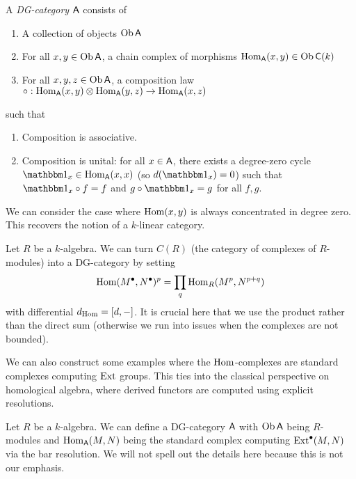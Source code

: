 \documentclass{amsart}
\begin{document}
\begin{dfn}
A \emph{DG-category} $\mathsf{A}$ consists of 
\begin{enumerate}
	\item A collection of objects $\operatorname{Ob} \mathsf{A}$
	\item For all $x, y \in \operatorname{Ob} \mathsf{A}$, a chain complex of morphisms $\operatorname{Hom}_{\mathsf{A}}(x, y) \in \operatorname{Ob} \mathsf{C}(k)$
	\item For all $x, y, z \in \operatorname{Ob} \mathsf{A}$, a composition law $\circ: \operatorname{Hom}_{\mathsf{A}}(x, y) \otimes \operatorname{Hom}_{\mathsf{A}}(y, z) \to \operatorname{Hom}_{\mathsf{A}}(x, z)$
\end{enumerate}
such that
\begin{enumerate}
	\item Composition is associative.
	\item Composition is unital: for all $x \in \mathsf{A}$, there exists a degree-zero cycle $\onebb_x \in \Hom_{\Asf}(x, x)$ (so $d(\onebb_x) = 0$) such that $\onebb_x \circ f = f$ and $g \circ \onebb_x = g$ for all $f, g$.
\end{enumerate}
\end{dfn}

\begin{ex}
We can consider the case where $\operatorname{Hom}(x, y)$ is always concentrated in degree zero.
This recovers the notion of a $k$-linear category.
\end{ex}

\begin{ex}
Let $R$ be a $k$-algebra.
We can turn $C(R)$ (the category of complexes of $R$-modules) into a DG-category by setting
\[
\operatorname{Hom}(M^\bullet, N^\bullet)^p = \prod_{q} \operatorname{Hom}_R(M^p, N^{p+q})
\]
with differential $d_{\operatorname{Hom}} = [d, -]$.
It is crucial here that we use the product rather than the direct sum (otherwise we run into issues when the complexes are not bounded).
\end{ex}

We can also construct some examples where the $\operatorname{Hom}$-complexes are standard complexes computing $\operatorname{Ext}$ groups.
This ties into the classical perspective on homological algebra, where derived functors are computed using explicit resolutions.

\begin{ex}
Let $R$ be a $k$-algebra.
We can define a DG-category $\mathsf{A}$ with $\operatorname{Ob} \mathsf{A}$ being $R$-modules and $\operatorname{Hom}_{\mathsf{A}}(M, N)$ being the standard complex computing $\operatorname{Ext}^\bullet(M, N)$ via the bar resolution.
We will not spell out the details here because this is not our emphasis.
\end{ex}
\end{document}
